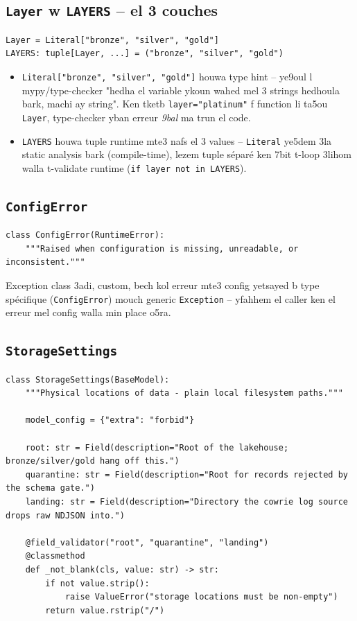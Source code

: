 \documentclass[11pt,a4paper]{report}
\DeclareRobustCommand{\code}[1]{\texttt{#1}}
\begin{document}
\subsection{\code{Layer} w \code{LAYERS} -- el 3 couches}

\begin{lstlisting}[style=pystyle]
Layer = Literal["bronze", "silver", "gold"]
LAYERS: tuple[Layer, ...] = ("bronze", "silver", "gold")
\end{lstlisting}

\begin{itemize}
  \item \code{Literal["bronze", "silver", "gold"]} houwa type hint -- ye9oul l
        mypy/type-checker "hedha el variable ykoun wahed mel 3 strings hedhoula
        bark, machi ay string". Ken tketb \code{layer="platinum"} f function li
        ta5ou \code{Layer}, type-checker yban erreur \emph{9bal} ma trun el code.
  \item \code{LAYERS} houwa tuple runtime mte3 nafs el 3 values -- \code{Literal}
        ye5dem 3la static analysis bark (compile-time), lezem tuple séparé ken
        7bit t-loop 3lihom walla t-validate runtime (\code{if layer not in LAYERS}).
\end{itemize}

\subsection{\code{ConfigError}}

\begin{lstlisting}[style=pystyle]
class ConfigError(RuntimeError):
    """Raised when configuration is missing, unreadable, or inconsistent."""
\end{lstlisting}

Exception class 3adi, custom, bech kol erreur mte3 config yetsayed b type
spécifique (\code{ConfigError}) mouch generic \code{Exception} -- yfahhem el
caller ken el erreur mel config walla min place o5ra.

\subsection{\code{StorageSettings}}

\begin{lstlisting}[style=pystyle]
class StorageSettings(BaseModel):
    """Physical locations of data - plain local filesystem paths."""

    model_config = {"extra": "forbid"}

    root: str = Field(description="Root of the lakehouse; bronze/silver/gold hang off this.")
    quarantine: str = Field(description="Root for records rejected by the schema gate.")
    landing: str = Field(description="Directory the cowrie log source drops raw NDJSON into.")

    @field_validator("root", "quarantine", "landing")
    @classmethod
    def _not_blank(cls, value: str) -> str:
        if not value.strip():
            raise ValueError("storage locations must be non-empty")
        return value.rstrip("/")
\end{lstlisting}
\end{document}
